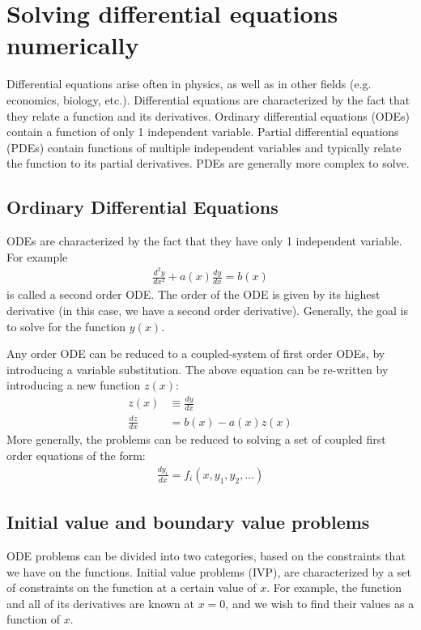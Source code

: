 \chapter{Solving differential equations numerically}
Differential equations arise often in physics, as well as in other fields (e.g. economics, biology, etc.). Differential equations are characterized by the fact that they relate a function and its derivatives. Ordinary differential equations (ODEs) contain a function of only 1 independent variable. Partial differential equations (PDEs) contain functions of multiple independent variables and typically relate the function to its partial derivatives. PDEs are generally more complex to solve.

\section{Ordinary Differential Equations}
ODEs are characterized by the fact that they have only 1 independent variable. For example
\begin{align}
 \frac{d^2y}{dx^2} + a(x) \frac{dy}{dx} = b(x) 
\end{align}
is called a second order ODE. The order of the ODE is given by its highest derivative (in this case, we have a second order derivative). Generally, the goal is to solve for the function $y(x)$. 

Any order ODE can be reduced to a coupled-system of first order ODEs, by introducing a variable substitution. The above equation can be re-written by introducing a new function $z(x)$:
\begin{align}
 z(x)&\equiv\frac{dy}{dx} \nonumber\\
 \frac{dz}{dx}&= b(x)-a(x)z(x) 
\end{align}
More generally, the problems can be reduced to solving a set of coupled first order equations of the form:
\begin{align}
 \frac{dy_i}{dx} = f_i(x, y_1,y_2,\ldots )
\end{align}

\section{Initial value and boundary value problems}
ODE problems can be divided into two categories, based on the constraints that we have on the functions. Initial value problems (IVP), are characterized by a set of constraints on the function at a certain value of $x$. For example, the function and all of its derivatives are known at $x=0$, and we wish to find their values as a function of $x$. 

